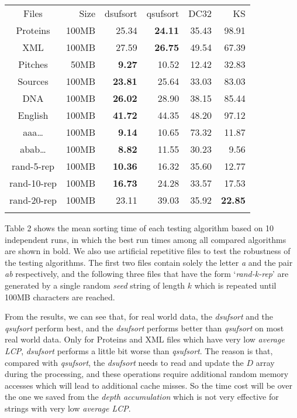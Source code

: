 \documentclass{ws-ijprai}
\begin{document}
\begin{table}
  { \begin{tabular}{crrrrr} \toprule
   Files & Size   & dsufsort  & qsufsort & DC32  & KS\\   \colrule
    Proteins   & 100MB  & 25.34 &\textbf{24.11}    & 35.43 & 98.91\\
    XML        & 100MB  & 27.59 &\textbf{26.75}    & 49.54 & 67.39 \\
    Pitches    & 50MB   &\textbf{9.27 } & 10.52    & 12.42 & 32.83 \\
    Sources    & 100MB  &\textbf{23.81} & 25.64    & 33.03 & 83.03 \\
    DNA        & 100MB  &\textbf{26.02} & 28.90    & 38.15 & 85.44 \\
    English    & 100MB  &\textbf{41.72} & 44.35    & 48.20 & 97.12 \\
    \colrule
    aaa\dots    & 100MB  &\textbf{9.14}  & 10.65 & 73.32 & 11.87\\
    abab\dots   & 100MB  &\textbf{8.82}  & 11.55 & 30.23 & 9.56\\
    rand-5-rep  & 100MB   &\textbf{10.36} & 16.32 & 35.60 & 12.77 \\
    rand-10-rep & 100MB   &\textbf{16.73} & 24.28 & 33.57 & 17.53 \\
    rand-20-rep & 100MB   & 23.11 & 39.03 & 35.92  & \textbf{22.85} \\
    \botrule
  \end{tabular}}
  \label{tab:time}
\end{table}

Table 2 shows the mean sorting time of each testing algorithm based on
10 independent runs, in which the best run times among all compared
algorithms are shown in bold. We also use artificial repetitive files
to test the robustness of the testing algorithms. The first two files
contain solely the letter \emph{a} and the pair \emph{ab}
respectively, and the following three files that have the form
`\emph{rand-k-rep}' are generated by a single random \emph{seed}
string of length $k$ which is repeated until 100MB characters are
reached.

From the results, we can see that, for real world data, the
\emph{dsufsort} and the \emph{qsufsort} perform best, and the
\emph{dsufsort} performs better than \emph{qsufsort} on most real
world data. Only for Proteins and XML files which have very low
\emph{average LCP}, \emph{dsufsort} performs a little bit worse than
\emph{qsufsort}. The reason is that, compared with \emph{qsufsort},
the \emph{dsufsort} needs to read and update the $D$ array during the
processing, and these operations require additional random memory
accesses which will lead to additional cache misses. So the time cost
will be over the one we saved from the \emph{depth accumulation} which
is not very effective for strings with very low \emph{average LCP}.
\end{document}

